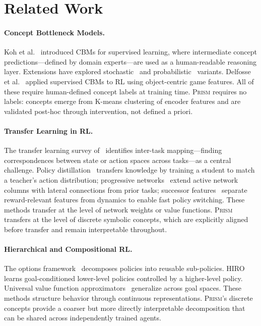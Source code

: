 \documentclass[11pt,a4paper]{article}
\newcommand{\prism}{\textsc{Prism}}
\begin{document}
\section{Related Work}

\paragraph{Concept Bottleneck Models.}
Koh et al.~\citep{koh2020concept} introduced CBMs for supervised learning, where intermediate concept predictions---defined by domain experts---are used as a human-readable reasoning layer. Extensions have explored stochastic~\citep{vandenhirtz2024stochastic} and probabilistic~\citep{kim2023probabilistic} variants. Delfosse et al.~\citep{delfosse2024interpretable} applied supervised CBMs to RL using object-centric game features. All of these require human-defined concept labels at training time. \prism{} requires no labels: concepts emerge from K-means clustering of encoder features and are validated post-hoc through intervention, not defined a priori.

\paragraph{Transfer Learning in RL.}
The transfer learning survey of~\citet{taylor2009transfer} identifies inter-task mapping---finding correspondences between state or action spaces across tasks---as a central challenge. Policy distillation~\citep{rusu2016policy} transfers knowledge by training a student to match a teacher's action distribution; progressive networks~\citep{rusu2016progressive} extend active network columns with lateral connections from prior tasks; successor features~\citep{barreto2017successor} separate reward-relevant features from dynamics to enable fast policy switching. These methods transfer at the level of network weights or value functions. \prism{} transfers at the level of discrete symbolic concepts, which are explicitly aligned before transfer and remain interpretable throughout.

\paragraph{Hierarchical and Compositional RL.}
The options framework~\citep{sutton1999between} decomposes policies into reusable sub-policies. HIRO~\citep{nachum2018data} learns goal-conditioned lower-level policies controlled by a higher-level policy. Universal value function approximators~\citep{schaul2015universal} generalize across goal spaces. These methods structure behavior through continuous representations. \prism{}'s discrete concepts provide a coarser but more directly interpretable decomposition that can be shared across independently trained agents.
\end{document}
